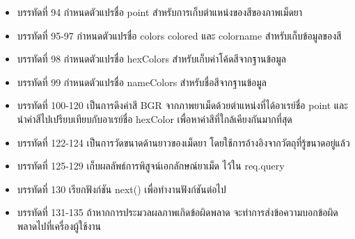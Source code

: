 \begin{itemize}[label={--}]
		\item บรรทัดที่ 94 	กำหนดตัวแปรชื่อ point สำหรับการเก็บตำแหน่งของสีของภาพเม็ดยา 
		\item บรรทัดที่ 95-97	กำหนดตัวแปรชื่อ colors colored และ colorname สำหรับเก็บข้อมูลของสี
		\item บรรทัดที่ 98	กำหนดตัวแปรชื่อ hexColors สำหรับเก็บค่าโค้ดสีจากฐานข้อมูล
		\item บรรทัดที่ 99	กำหนดตัวแปรชื่อ nameColors สำหรับชื่อสีจากฐานข้อมูล
		\item บรรทัดที่ 100-120 เป็นการดึงค่าสี BGR จากภาพยาเม็ดด้วยตำแหน่งที่ได้อาเรย์ชื่อ point และนำค่าสีไปเปรียบเทียบกับอาเรย์ชื่อ hexColor เพื่อหาค่าสีที่ใกล้เคียงกันมากที่สุด
		\item บรรทัดที่ 122-124 เป็นการวัดขนาดด้านยาวของเม็ดยา โดยใช้การอ้างอิงจากวัตถุที่รู้ขนาดอยู่แล้ว
		\item บรรทัดที่ 125-129 เก็บผลลัพธ์การพิสูจน์เอกลักษณ์ยาเม็ด ไว้ใน req.query 
		\item บรรทัดที่ 130	เรียกฟังก์ชัน next() เพื่อทำงานฟังก์ชันต่อไป
		\item บรรทัดที่ 131-135 ถ้าหากการประมวลผลภาพเกิดข้อผิดพลาด จะทำการส่งข้อความบอกข้อผิดพลาดไปที่เครื่องผู้ใช้งาน
	\end{itemize}

